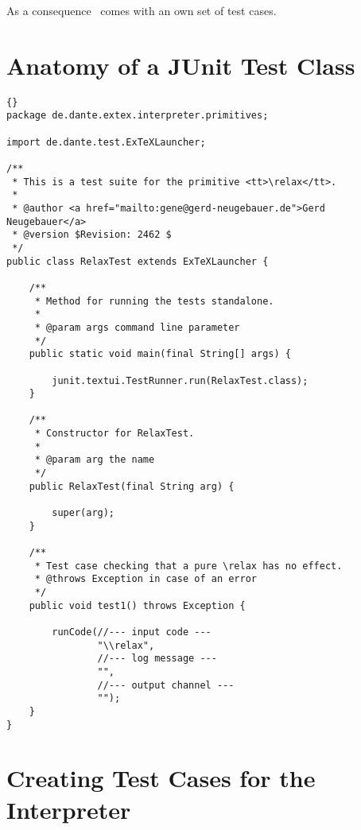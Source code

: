 As a consequence \ExTeX\ comes with an own set of test cases.

\section{Anatomy of a JUnit Test Class}

\INCOMPLETE

\begin{lstlisting}{}
package de.dante.extex.interpreter.primitives;

import de.dante.test.ExTeXLauncher;

/**
 * This is a test suite for the primitive <tt>\relax</tt>.
 *
 * @author <a href="mailto:gene@gerd-neugebauer.de">Gerd Neugebauer</a>
 * @version $Revision: 2462 $
 */
public class RelaxTest extends ExTeXLauncher {

    /**
     * Method for running the tests standalone.
     *
     * @param args command line parameter
     */
    public static void main(final String[] args) {

        junit.textui.TestRunner.run(RelaxTest.class);
    }

    /**
     * Constructor for RelaxTest.
     *
     * @param arg the name
     */
    public RelaxTest(final String arg) {

        super(arg);
    }

    /**
     * Test case checking that a pure \relax has no effect.
     * @throws Exception in case of an error
     */
    public void test1() throws Exception {

        runCode(//--- input code ---
                "\\relax",
                //--- log message ---
                "",
                //--- output channel ---
                "");
    }
}
\end{lstlisting}


\section{Creating Test Cases for the Interpreter}

\INCOMPLETE

